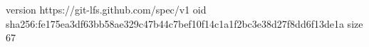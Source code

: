 version https://git-lfs.github.com/spec/v1
oid sha256:fe175ea3df63bb58ae329c47b44c7bef10f14c1a1f2bc3e38d27f8dd6f13de1a
size 67
